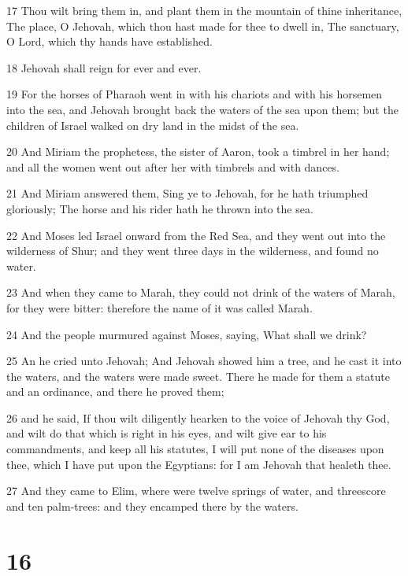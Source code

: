 \par 17 Thou wilt bring them in, and plant them in the mountain of thine inheritance, The place, O Jehovah, which thou hast made for thee to dwell in, The sanctuary, O Lord, which thy hands have established.
\par 18 Jehovah shall reign for ever and ever.
\par 19 For the horses of Pharaoh went in with his chariots and with his horsemen into the sea, and Jehovah brought back the waters of the sea upon them; but the children of Israel walked on dry land in the midst of the sea.
\par 20 And Miriam the prophetess, the sister of Aaron, took a timbrel in her hand; and all the women went out after her with timbrels and with dances.
\par 21 And Miriam answered them, Sing ye to Jehovah, for he hath triumphed gloriously; The horse and his rider hath he thrown into the sea.
\par 22 And Moses led Israel onward from the Red Sea, and they went out into the wilderness of Shur; and they went three days in the wilderness, and found no water.
\par 23 And when they came to Marah, they could not drink of the waters of Marah, for they were bitter: therefore the name of it was called Marah.
\par 24 And the people murmured against Moses, saying, What shall we drink?
\par 25 An he cried unto Jehovah; And Jehovah showed him a tree, and he cast it into the waters, and the waters were made sweet. There he made for them a statute and an ordinance, and there he proved them;
\par 26 and he said, If thou wilt diligently hearken to the voice of Jehovah thy God, and wilt do that which is right in his eyes, and wilt give ear to his commandments, and keep all his statutes, I will put none of the diseases upon thee, which I have put upon the Egyptians: for I am Jehovah that healeth thee.
\par 27 And they came to Elim, where were twelve springs of water, and threescore and ten palm-trees: and they encamped there by the waters.

\chapter{16}

